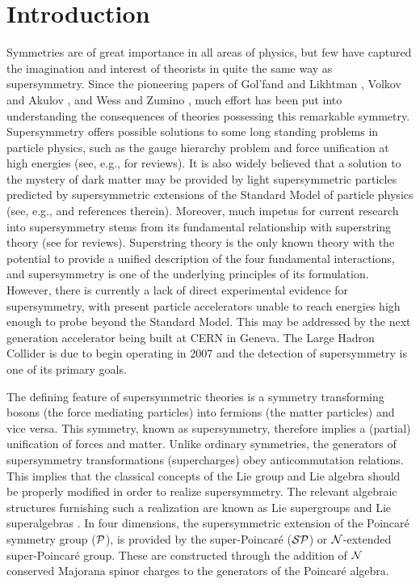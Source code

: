 \chapter*{Introduction}

\vskip0.5cm

Symmetries are of great importance in all areas of physics, but few have captured the imagination and interest of theorists in quite the same way as supersymmetry. Since the pioneering papers of Gol'fand and Likhtman \cite{Golfand:1971iw}, Volkov and Akulov \cite{Volkov:1972jx,Volkov:1973ix}, and Wess and Zumino \cite{Wess:1974tw,Wess:1973kz}, much effort has been put into understanding the consequences of theories possessing this remarkable symmetry. Supersymmetry offers possible solutions to some long standing problems in particle physics, such as the gauge hierarchy problem and force unification at high energies (see, e.g., \cite{Nilles:1983ge,Haber:1984rc,Mohapatra:1986uf,Weinberg:2000cr} for reviews). It is also widely believed that a solution to the mystery of dark matter may be provided by light supersymmetric particles predicted by supersymmetric extensions of the Standard Model of particle physics (see, e.g., \cite{Bertone:2004pz} and references therein). Moreover, much impetus for current research into supersymmetry stems from its fundamental relationship with superstring theory (see \cite{Green:1987sp, Green:1987mn,Lust:1989tj,Polchinski:1998rq,Polchinski:1998rr,Zwiebach:2004tj} for reviews). Superstring theory is the only known theory with the potential to provide a unified description of the four fundamental interactions, and supersymmetry is one of the underlying principles of its formulation. However, there is currently a lack of direct experimental evidence for supersymmetry, with present particle accelerators unable to reach energies high enough to probe beyond the Standard Model. This may be addressed by the next generation accelerator being built at CERN in Geneva. The Large Hadron Collider is due to begin operating in 2007 and the detection of supersymmetry is one of its primary goals.

The defining feature of supersymmetric theories is a symmetry transforming bosons (the force mediating particles) into fermions (the matter particles) and vice versa. This symmetry, known as supersymmetry, therefore implies a (partial) unification of forces and matter. Unlike ordinary symmetries, the generators of supersymmetry transformations (supercharges) obey anticommutation relations. This implies that the classical concepts of the Lie group and Lie algebra should be properly modified in order to realize supersymmetry. The relevant algebraic structures furnishing such a realization are known as Lie supergroups and Lie superalgebras \cite{Berezin:1966nc,Berezin:1987wh,DeWitt:1992cy,Frappat:1996pb}. In four dimensions, the supersymmetric extension of the Poincar{\'e} symmetry  group (${\cal P}$), is provided by the super-Poincar{\'e} (${\cal SP}$) or ${\cal N}$-extended super-Poincar{\'e} group. These are constructed through the addition of ${\cal N}$ conserved Majorana spinor charges to the generators of the Poincar{\'e} algebra.

